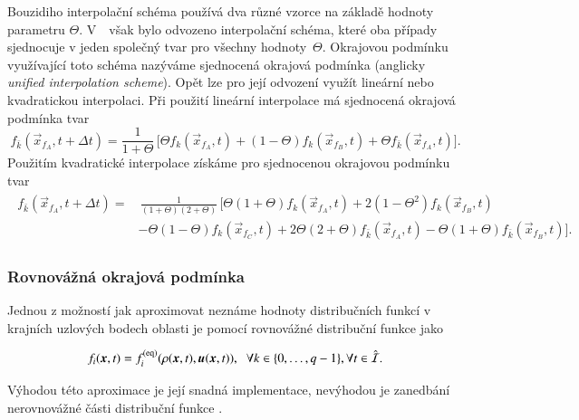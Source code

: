 Bouzidiho interpolační schéma používá dva různé vzorce na základě hodnoty parametru $ \Theta $. V~\cite{Yu2003}~však bylo odvozeno interpolační schéma, které oba případy sjednocuje v jeden společný tvar pro všechny hodnoty~$ \Theta $. Okrajovou podmínku využívající toto schéma nazýváme sjednocená okrajová podmínka (anglicky \textit{unified interpolation scheme}). Opět lze pro její odvození využít lineární nebo kvadratickou interpolaci.
Při použití lineární interpolace má sjednocená okrajová podmínka tvar
\begin{equation}\label{eq:luni}
f_{\bar{k}}\left(\vec{x}_{f{_A}}, t+\Delta t\right)= \frac{1}{1+\Theta} \, \Big[ \Theta f_{k}\left(\vec{x}_{f{_A}}, t\right)+(1-\Theta) {f}_{k}\left(\vec{x}_{f{_B}}, t\right) +\Theta {f}_{\bar{k}}\left(\vec{x}_{f{_A}}, t\right) \Big].
\end{equation}
Použitím kvadratické interpolace získáme pro sjednocenou okrajovou podmínku tvar
\begin{align}\label{eq:quni}
\begin{split}
f_{\bar{k}}\left(\vec{x}_{f_A}, t+\Delta t\right)=& \,
\frac{1}{(1+\Theta)(2+\Theta)} \, \Big[\Theta(1+\Theta) {f}_{k}\left(\vec{x}_{f{_A}}, t\right)+2\left(1-\Theta^{2}\right) {f}_{k}\left(\vec{x}_{f{_B}}, t\right)
\\&-\Theta(1-\Theta) {f}_{k}\left(\vec{x}_{f{_C}}, t\right)+2 \Theta(2+\Theta) {f}_{\bar{k}}\left(\vec{x}_{f{_A}}, t\right) 
-\Theta(1+\Theta) {f}_{\bar{k}}\left(\vec{x}_{f{_B}}, t\right) \Big].
\end{split}\end{align}

\subsubsection{Rovnovážná okrajová podmínka}\label{equilibrium bc}
Jednou z možností jak aproximovat neznáme hodnoty distribučních funkcí v krajních uzlových bodech oblasti je pomocí rovnovážné distribuční funkce jako \cite{PE}

\begin{equation}
	f_i(\vec{x}, t)=f_{i}^{\text{(eq)}}(\rho(\vec{x}, t), \vec{u}(\vec{x}, t)), \hspace{2mm}  \forall k \in \{0,\dots,q-1\}, \forall t \in \hat{\mathcal{I}}.
\end{equation}

Výhodou této aproximace je její snadná implementace, nevýhodou je zanedbání nerovnovážné části distribuční funkce \cite{PE}.

